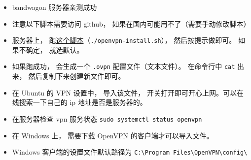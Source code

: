 
\begin{issues}
\issueDraft
\end{issues}

\begin{itemize}
\item bandwagon 服务器亲测成功
\item 注意以下脚本需要访问 github， 如果在国内可能用不了（需要手动修改脚本）
\item 服务器上， 跑\href{https://github.com/MacroUniverse/openvpn-install/blob/master/openvpn-install.sh}{这个脚本}（\verb|./openvpn-install.sh|）， 然后按提示做即可。 如果不确定， 就选默认。
\item 如果跑成功， 会生成一个 \verb|.ovpn| 配置文件（文本文件）。 在命令行中 \verb|cat| 出来， 然后复制下来创建新文件即可。
\item 在 Ubuntu 的 VPN 设置中， 导入该文件， 开关打开即可开心上网。可以在线搜索一下自己的 ip 地址是否是服务器的。
\item 在服务器检查 vpn 服务状态 \verb`sudo systemctl status openvpn`
\item 在 Windows 上， 需要下载 OpenVPN 的客户端才可以导入文件。
\item Windows 客户端的设置文件默认路径为 \verb|C:\Program Files\OpenVPN\config\|
\end{itemize}

